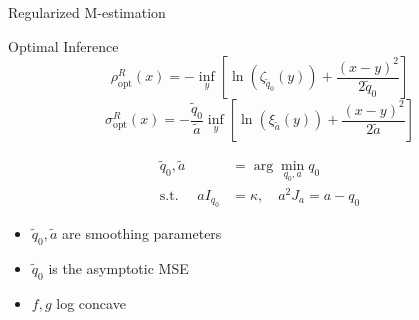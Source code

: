 \documentclass[pdf]{beamer}
\begin{document}
\begin{frame}{Regularized M-estimation}

\begin{block}{Optimal Inference}
\begin{equation*}
 \rho_{\text{opt}}^R(x) =  -\inf_y{\left[ \ln(\zeta_{\tilde{q}_0}(y)) + \frac{(x-y)^2}{2 \tilde{q}_0}\right]}
\end{equation*}
\begin{equation*}
\sigma_{\text{opt}}^{R}(x)=-\frac{\tilde{q}_0}{\tilde{a}}\inf_y{\left[ \ln(\xi_{\tilde{a}}(y)) +\frac{(x-y)^2}{2 \tilde{a}}\right]} \label{optReg}
\end{equation*}



\begin{equation*}
\begin{split}
\tilde{q}_0,\tilde{a} &= \arg\min_{q_0,a}{q_0} \\
\text{s.t. }\quad  a I_{q_0} & = \kappa,\quad a^2 J_a = a-q_0
\label{unregopt}
\end{split}
\end{equation*}


\begin{itemize}
\item $\tilde{q}_0,\tilde{a}$ are smoothing parameters
\item $\tilde{q}_0$ is the asymptotic MSE
\item $f,g$ log concave
\end{itemize}
\end{block}
\end{frame}
\end{document}
